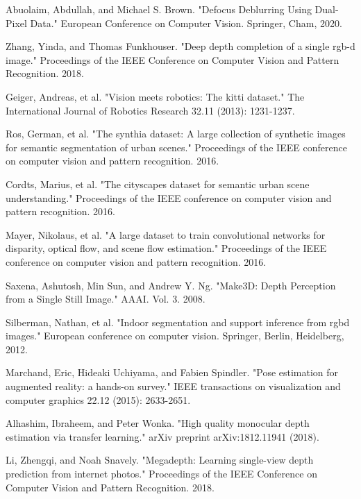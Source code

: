 \documentclass{article}
\begin{document}
\begin{thebibliography}{10}
 Abuolaim, Abdullah, and Michael S. Brown. "Defocus Deblurring Using Dual-Pixel Data." European Conference on Computer Vision. Springer, Cham, 2020.

 Zhang, Yinda, and Thomas Funkhouser. "Deep depth completion of a single rgb-d image." Proceedings of the IEEE Conference on Computer Vision and Pattern Recognition. 2018.

 Geiger, Andreas, et al. "Vision meets robotics: The kitti dataset." The International Journal of Robotics Research 32.11 (2013): 1231-1237.

 Ros, German, et al. "The synthia dataset: A large collection of synthetic images for semantic segmentation of urban scenes." Proceedings of the IEEE conference on computer vision and pattern recognition. 2016.

 Cordts, Marius, et al. "The cityscapes dataset for semantic urban scene understanding." Proceedings of the IEEE conference on computer vision and pattern recognition. 2016.

 Mayer, Nikolaus, et al. "A large dataset to train convolutional networks for disparity, optical flow, and scene flow estimation." Proceedings of the IEEE conference on computer vision and pattern recognition. 2016.

 Saxena, Ashutosh, Min Sun, and Andrew Y. Ng. "Make3D: Depth Perception from a Single Still Image." AAAI. Vol. 3. 2008.

 Silberman, Nathan, et al. "Indoor segmentation and support inference from rgbd images." European conference on computer vision. Springer, Berlin, Heidelberg, 2012.

 Marchand, Eric, Hideaki Uchiyama, and Fabien Spindler. "Pose estimation for augmented reality: a hands-on survey." IEEE transactions on visualization and computer graphics 22.12 (2015): 2633-2651.

 Alhashim, Ibraheem, and Peter Wonka. "High quality monocular depth estimation via transfer learning." arXiv preprint arXiv:1812.11941 (2018).

 Li, Zhengqi, and Noah Snavely. "Megadepth: Learning single-view depth prediction from internet photos." Proceedings of the IEEE Conference on Computer Vision and Pattern Recognition. 2018.


\end{thebibliography}
\end{document}
